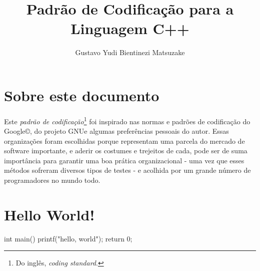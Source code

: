 \documentclass{article}
\begin{document}
\title{Padrão de Codificação para a Linguagem C++}
\author{Gustavo Yudi Bientinezi Matsuzake}
\maketitle




\section{Sobre este documento}

Este \emph{padrão de codificação}\footnote{Do inglês, \emph{coding standard}.} foi inspirado nas normas e padrões de codificação do Google\copyright, do projeto GNU\textcopyleft e algumas preferências pessoais do autor. Essas organizações foram escolhidas porque representam uma parcela do mercado de software importante, e aderir os costumes e trejeitos de cada, pode ser de suma importância para garantir uma boa prática organizacional - uma vez que esses métodos sofreram diversos tipos de testes - e acolhida por um grande número de programadores no mundo todo.

\section{Hello World!}

\begin{code}
int main() {
  printf("hello, world");
  return 0;
}
\end{code}

\end{document}
